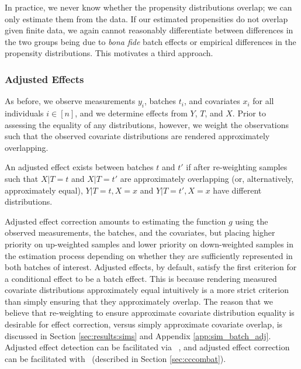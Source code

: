 {{In practice, we never know whether the propensity distributions overlap; we can only estimate them from the data. If our estimated propensities do not overlap given finite data, we again cannot reasonably differentiate between differences in the two groups being due to \textit{bona fide} batch effects or empirical differences in the propensity distributions. This motivates a third approach. 

\subsubsection{Adjusted Effects}

As before, we observe measurements $y_i$, batches $t_i$, and covariates $x_i$ for all individuals $i \in [n]$, and we determine effects from $Y$, $T$, and $X$. Prior to assessing the equality of any distributions, however, we weight the observations such that the observed covariate distributions are rendered approximately overlapping.

\begin{flushleft}\begin{definition}
An adjusted effect exists between batches $t$ and $t'$ if after re-weighting samples such that $X | T = t$ and $X | T = t'$ are approximately overlapping (or, alternatively, approximately equal), $Y | T = t, X = x$ and $Y | T = t', X = x$ have different distributions.
\label{def:ass_site_effect_informal}
\end{definition}
\end{flushleft}

Adjusted effect correction amounts to estimating the function $g$ using the observed measurements, the batches, and the covariates, but placing higher priority on up-weighted samples and lower priority on down-weighted samples in the estimation process depending on whether they are sufficiently represented in both batches of interest. Adjusted effects, by default, satisfy the first criterion for a conditional effect to be a batch effect. This is because rendering measured covariate distributions approximately equal intuitively is a more strict criterion than simply ensuring that they approximately overlap. The reason that we believe that re-weighting to ensure approximate covariate distribution equality is desirable for effect correction, versus simply approximate covariate overlap, is discussed in Section \ref{sec:results:sims} and Appendix \ref{app:sim_batch_adj}. Adjusted effect detection can be facilitated via \ccdcorr~\cite{Bridgeford2023Jul}, and adjusted effect correction can be facilitated with \cccombat~(described in Section \ref{sec:cccombat}).

}}
